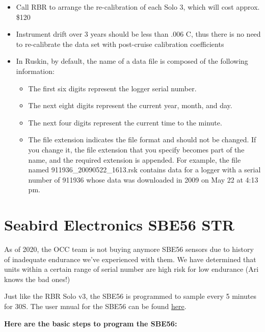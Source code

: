 \documentclass[]{book}
\providecommand{\tightlist}{%
  \setlength{\itemsep}{0pt}\setlength{\parskip}{0pt}}
\begin{document}
\begin{itemize}
\item
  Call RBR to arrange the re-calibration of each Solo 3, which will cost approx. \$120
\item
  Instrument drift over 3 years should be less than .006 C, thus there is no need to re-calibrate the data set with post-cruise calibration coefficients
\item
  In Ruskin, by default, the name of a data file is composed of the following information:

  \begin{itemize}
  \tightlist
  \item
    The first six digits represent the logger serial number.
  \item
    The next eight digits represent the current year, month, and day.
  \item
    The next four digits represent the current time to the minute.
  \item
    The file extension indicates the file format and should not be changed. If you change it, the file extension that you specify becomes part of the name, and the required extension is appended. For example, the file named 911936\_20090522\_1613.rsk contains data for a logger with a serial number of 911936 whose data was downloaded in 2009 on May 22 at 4:13 pm.
  \end{itemize}
\end{itemize}

\hypertarget{sbe56}{%
\section{Seabird Electronics SBE56 STR}\label{sbe56}}

As of 2020, the OCC team is not buying anymore SBE56 sensors due to history of inadequate endurance we've experienced with them. We have determined that units within a certain range of serial number are high risk for low endurance (Ari knows the bad ones!)

Just like the RBR Solo v3, the SBE56 is programmed to sample every 5 minutes for 30S. The user mnual for the SBE56 can be found \href{https://drive.google.com/drive/folders/1ujFmH1pJ704ikrsc11Ji2eNeuIBQ5JMa}{here}.

\textbf{Here are the basic steps to program the SBE56:}
\end{document}
